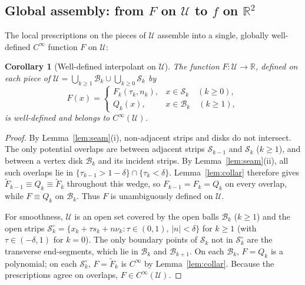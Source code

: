 \documentclass[11pt]{article}
\newtheorem{corollary}[theorem]{Corollary}
\newcommand{\R}{\mathbb{R}}
\begin{document}
\subsection{Global assembly: from \texorpdfstring{$F$ on $\mathcal U$ to $f$ on $\R^2$}{F on U to f on R\textasciicircum 2}}
\label{sec:core}

The local prescriptions on the pieces of $\mathcal U$ assemble into a single, globally well-defined $C^\infty$ function $F$ on $\mathcal U$:

\begin{corollary}[Well-defined interpolant on $\mathcal U$]
\label{cor:F}
The function $F: \mathcal U \to \R$, defined on each piece of $\mathcal U = \bigcup_{k\ge 1}\mathcal B_k \cup \bigcup_{k\ge 0}\mathcal S_k$ by
\begin{equation}
\label{eq:Fdef}
F(x) = \begin{cases}
F_k(\tau_k, n_k), & x \in \mathcal S_k \quad (k \ge 0), \\
Q_k(x), & x \in \mathcal B_k \quad (k \ge 1),
\end{cases}
\end{equation}
is well-defined and belongs to $C^\infty(\mathcal U)$.
\end{corollary}

\begin{proof}
By Lemma~\ref{lem:seam}(i), non-adjacent strips and disks do not intersect.
The only potential overlaps are between adjacent strips $\mathcal S_{k-1}$ and $\mathcal S_k$ ($k \ge 1$), and between a vertex disk $\mathcal B_k$ and its incident strips.
By Lemma~\ref{lem:seam}(ii), all such overlaps lie in $\{\tau_{k-1}>1-\delta\}\cap\{\tau_k<\delta\}$.
Lemma~\ref{lem:collar} therefore gives $\widetilde F_{k-1}\equiv Q_k\equiv\widetilde F_k$ throughout this wedge, so $F_{k-1}=F_k=Q_k$ on every overlap, while $F\equiv Q_k$ on $\mathcal B_k$. Thus $F$ is unambiguously defined on $\mathcal U$.

For smoothness, $\mathcal U$ is an open set covered by the open balls $\mathcal B_k$ ($k\ge 1$) and the open strips $\mathcal S_k^\circ = \{x_k+\tau s_k+n\nu_k:\tau\in(0,1),\,|n|<\delta\}$ for $k\ge 1$ (with $\tau\in(-\delta,1)$ for $k=0$).
The only boundary points of $\mathcal S_k$ not in $\mathcal S_k^\circ$ are the transverse end-segments, which lie in $\mathcal B_k$ and $\mathcal B_{k+1}$.
On each $\mathcal B_k$, $F=Q_k$ is a polynomial; on each $\mathcal S_k^\circ$, $F=\widetilde F_k$ is $C^\infty$ by Lemma~\ref{lem:collar}.
Because the prescriptions agree on overlaps, $F\in C^\infty(\mathcal U)$.
\end{proof}
\end{document}
